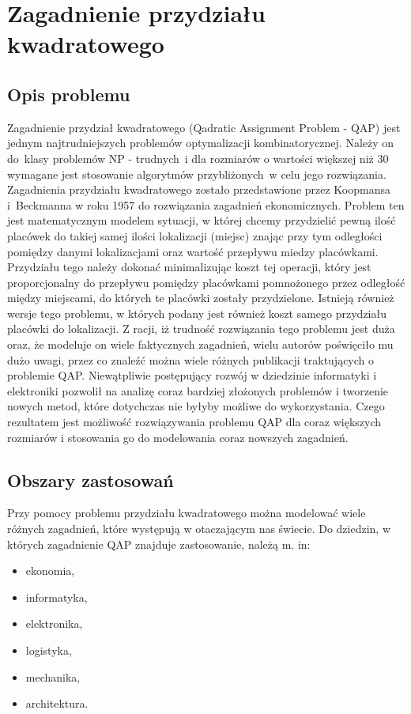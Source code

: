 \chapter{Zagadnienie przydziału kwadratowego}
\label{cha:qap}

\section{Opis problemu}
\label{sec:opis}
Zagadnienie przydział kwadratowego (Qadratic Assignment Problem - QAP) jest jednym najtrudniejszych problemów optymalizacji kombinatorycznej. Należy on do~klasy problemów NP - trudnych~i dla rozmiarów o wartości większej niż 30 wymagane jest stosowanie algorytmów przybliżonych~w celu jego rozwiązania. Zagadnienia przydziału kwadratowego zostało przedstawione przez Koopmansa i~Beckmanna w roku 1957 do rozwiązania zagadnień ekonomicznych. Problem ten jest matematycznym modelem sytuacji, w której chcemy przydzielić pewną ilość placówek do takiej samej ilości lokalizacji (miejsc) znając przy tym odległości pomiędzy danymi lokalizacjami oraz wartość przepływu miedzy placówkami. Przydziału tego należy dokonać minimalizując koszt tej operacji, który jest proporcjonalny do przepływu pomiędzy placówkami pomnożonego przez odległość między miejscami, do których te placówki zostały przydzielone. Istnieją również wersje tego problemu, w których podany jest również koszt samego przydziału placówki do lokalizacji. Z racji, iż trudność rozwiązania tego problemu jest duża oraz, że modeluje on wiele faktycznych zagadnień, wielu autorów poświęciło mu dużo uwagi, przez co znaleźć można wiele różnych publikacji traktujących o problemie QAP. Niewątpliwie postępujący rozwój w dziedzinie informatyki i elektroniki pozwolił na analizę coraz bardziej złożonych problemów i tworzenie nowych metod, które dotychczas nie byłyby możliwe do wykorzystania. Czego rezultatem jest możliwość rozwiązywania problemu QAP dla coraz większych rozmiarów i stosowania go do modelowania coraz nowszych zagadnień.

\section{Obszary zastosowań}
\label{sec:zastosowanie}
Przy pomocy problemu przydziału kwadratowego można modelować wiele różnych zagadnień, które występują w otaczającym nas świecie. Do dziedzin, w których zagadnienie QAP znajduje zastosowanie, należą m. in:
\begin{itemize}
\item ekonomia,
\item informatyka,
\item elektronika,
\item logistyka,
\item mechanika,
\item architektura.
\end{itemize}

